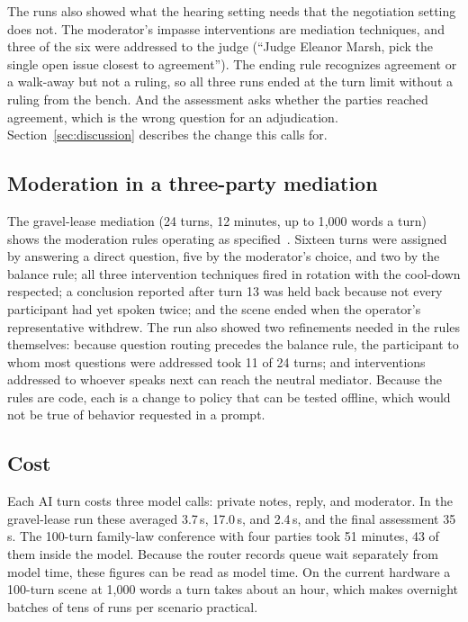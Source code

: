 \documentclass[acmsmall,screen,review]{acmart}
\begin{document}
The runs also showed what the hearing setting needs that the negotiation setting does not. The moderator's impasse interventions are mediation techniques, and three of the six were addressed to the judge (``Judge Eleanor Marsh, pick the single open issue closest to agreement''). The ending rule recognizes agreement or a walk-away but not a ruling, so all three runs ended at the turn limit without a ruling from the bench. And the assessment asks whether the parties reached agreement, which is the wrong question for an adjudication. Section~\ref{sec:discussion} describes the change this calls for.

\subsection{Moderation in a three-party mediation}

The gravel-lease mediation (24 turns, 12 minutes, up to 1{,}000 words a turn) shows the moderation rules operating as specified~\cite{gong2026moderation}. Sixteen turns were assigned by answering a direct question, five by the moderator's choice, and two by the balance rule; all three intervention techniques fired in rotation with the cool-down respected; a conclusion reported after turn 13 was held back because not every participant had yet spoken twice; and the scene ended when the operator's representative withdrew. The run also showed two refinements needed in the rules themselves: because question routing precedes the balance rule, the participant to whom most questions were addressed took 11 of 24 turns; and interventions addressed to whoever speaks next can reach the neutral mediator. Because the rules are code, each is a change to policy that can be tested offline, which would not be true of behavior requested in a prompt.

\subsection{Cost}

Each AI turn costs three model calls: private notes, reply, and moderator. In the gravel-lease run these averaged 3.7\,s, 17.0\,s, and 2.4\,s, and the final assessment 35\,s. The 100-turn family-law conference with four parties took 51 minutes, 43 of them inside the model. Because the router records queue wait separately from model time, these figures can be read as model time. On the current hardware a 100-turn scene at 1{,}000 words a turn takes about an hour, which makes overnight batches of tens of runs per scenario practical.
\end{document}
